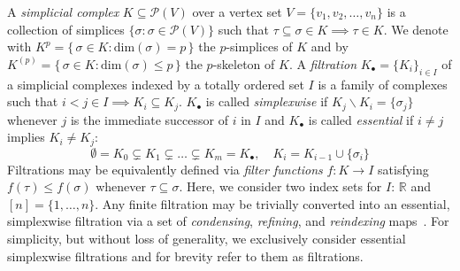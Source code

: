 A \emph{simplicial complex} $K \subseteq \mathcal{P}(V)$ over a vertex set $V = \{v_1, v_2, \dots, v_n \}$ is a collection of simplices $\{\sigma : \sigma \in \mathcal{P}(V) \}$ such that $\tau \subseteq \sigma \in K \implies \tau \in K$.
We denote with $K^p = \{ \, \sigma \in K : \mathrm{dim}(\sigma) = p \, \}$ the $p$-simplices of $K$ and by $K^{(p)} = \{ \, \sigma \in K : \mathrm{dim}(\sigma) \leq p \, \}$ the $p$-skeleton of $K$. 
A \emph{filtration} $K_\bullet = \{K_i\}_{i\in I}$ of a simplicial complexes indexed by a totally ordered set $I$ is a family of complexes such that $i< j \in I \implies K_i \subseteq K_j$. $K_\bullet$ is called \emph{simplexwise} if $K_j \smallsetminus K_i = \{\sigma_j\}$ whenever $j$ is the immediate successor of $i$ in $I$ and $K_\bullet$ is called \emph{essential} if $i \neq j$ implies $K_i \neq K_j$:
\begin{equation}
	\emptyset = K_0 \subsetneq K_1 \subsetneq \dots \subsetneq K_m  = K_\bullet, \quad K_i  = K_{i-1} \cup \{\sigma_i\}
\end{equation} 
Filtrations may be equivalently defined via \emph{filter functions} $f : K \to I$ satisfying $f(\tau) \leq f(\sigma)$ whenever $\tau \subseteq \sigma$. Here, we consider two index sets for $I$: $\mathbb{R}$ and $[n] = \{ 1, \dots, n\}$. 
Any finite filtration may be trivially converted into an essential, simplexwise filtration via a set of \emph{condensing}, \emph{refining}, and \emph{reindexing} maps~\cite{bauer2021ripser}. For simplicity, but without loss of generality, we exclusively consider essential simplexwise filtrations and for brevity refer to them as filtrations.
